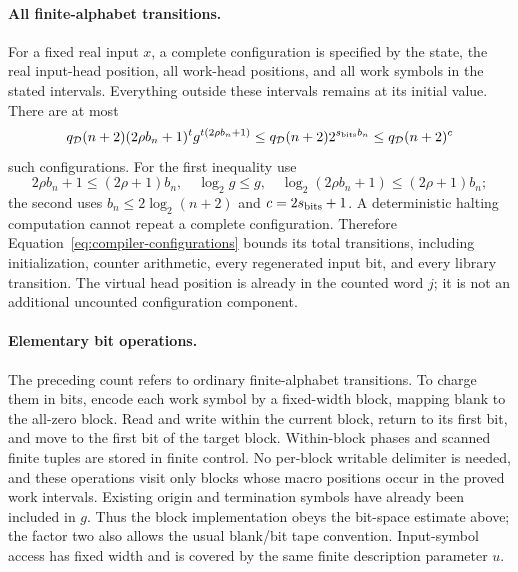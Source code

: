 \documentclass[11pt]{article}
\numberwithin{equation}{section}
\theoremstyle{definition}
\theoremstyle{remark}
\begin{document}
\paragraph{All finite-alphabet transitions.}
For a fixed real input $x$, a complete configuration is specified by
the state, the real input-head position, all work-head positions, and
all work symbols in the stated intervals.  Everything outside these
intervals remains at its initial value.  There are at most
\begin{equation}\label{eq:compiler-configurations}
 q_{\mathcal{D}}(n+2)(2\rho {b}_n+1)^t
       g^{t(2\rho {b}_n+1)}
 \le q_{\mathcal{D}}(n+2)2^{{s_{\rm bits}}{b}_n}
 \le q_{\mathcal{D}}(n+2)^c
\end{equation}
such configurations.  For the first inequality use
\[
 2\rho {b}_n+1\le(2\rho+1){b}_n,
 \quad \log_2g\le g,
 \quad \log_2(2\rho {b}_n+1)\le(2\rho+1){b}_n;
\]
the second uses ${b}_n\le2\log_2(n+2)$ and $c=2{s_{\rm bits}}+1$.
A deterministic halting computation cannot repeat a complete
configuration.  Therefore Equation~\eqref{eq:compiler-configurations}
bounds its total transitions, including initialization, counter
arithmetic, every regenerated input bit, and every library transition.
The virtual head position is already in the counted word ${j}$; it is
not an additional uncounted configuration component.

\paragraph{Elementary bit operations.}
The preceding count refers to ordinary finite-alphabet transitions.
To charge them in bits, encode each work symbol by a fixed-width block,
mapping blank to the all-zero block.  Read and write within the current
block, return to its first bit, and move to the first bit of the target
block.  Within-block phases and scanned finite tuples are stored in
finite control.  No per-block writable delimiter is needed, and these
operations visit only blocks whose macro positions occur in the proved
work intervals.  Existing origin and termination symbols have already
been included in $g$.  Thus the block implementation obeys the bit-space
estimate above; the factor two also allows the usual blank/bit tape
convention.  Input-symbol access has fixed width and is covered by the
same finite description parameter $u$.
\end{document}
